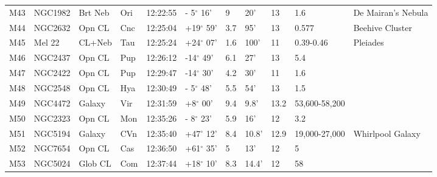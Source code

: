 \begin{longtable}{@{}lllllllllll@{}}
M43        & NGC1982     & Brt Neb    & Ori       & 12:22:55 & - 5$^{\circ}$ 16'  & 9         & 20'                  & 13       & 1.6                 & De Mairan's Nebula                        \\
M44        & NGC2632     & Opn CL     & Cnc       & 12:25:04 & +19$^{\circ}$ 59'  & 3.7       & 95'                  & 13       & 0.577               & Beehive Cluster                           \\
M45        & Mel 22      & CL+Neb     & Tau       & 12:25:24 & +24$^{\circ}$ 07'  & 1.6       & 100'                 & 11       & 0.39-0.46           & Pleiades                                  \\
M46        & NGC2437     & Opn CL     & Pup       & 12:26:12 & -14$^{\circ}$ 49'  & 6.1       & 27'                  & 13       & 5.4                 &                                           \\
M47        & NGC2422     & Opn CL     & Pup       & 12:29:47 & -14$^{\circ}$ 30'  & 4.2       & 30'                  & 11       & 1.6                 &                                           \\
M48        & NGC2548     & Opn CL     & Hya       & 12:30:49 & - 5$^{\circ}$ 48'  & 5.5       & 54'                  & 13       & 1.5                 &                                           \\
M49        & NGC4472     & Galaxy     & Vir       & 12:31:59 & +8$^{\circ}$ 00'   & 9.4       & 9.8'                 & 13.2     & 53,600-58,200       &                                           \\
M50        & NGC2323     & Opn CL     & Mon       & 12:35:26 & - 8$^{\circ}$ 23'  & 5.9       & 16'                  & 12       & 3.2                 &                                           \\
M51        & NGC5194     & Galaxy     & CVn       & 12:35:40 & +47$^{\circ}$ 12'  & 8.4       & 10.8'                & 12.9     & 19,000-27,000       & Whirlpool Galaxy                          \\
M52        & NGC7654     & Opn CL     & Cas       & 12:36:50 & +61$^{\circ}$ 35'  & 5         & 13'                  & 12       & 5                   &                                           \\
M53        & NGC5024     & Glob CL    & Com       & 12:37:44 & +18$^{\circ}$ 10'  & 8.3       & 14.4'                & 12       & 58                  &                                           \\

\end{longtable}
